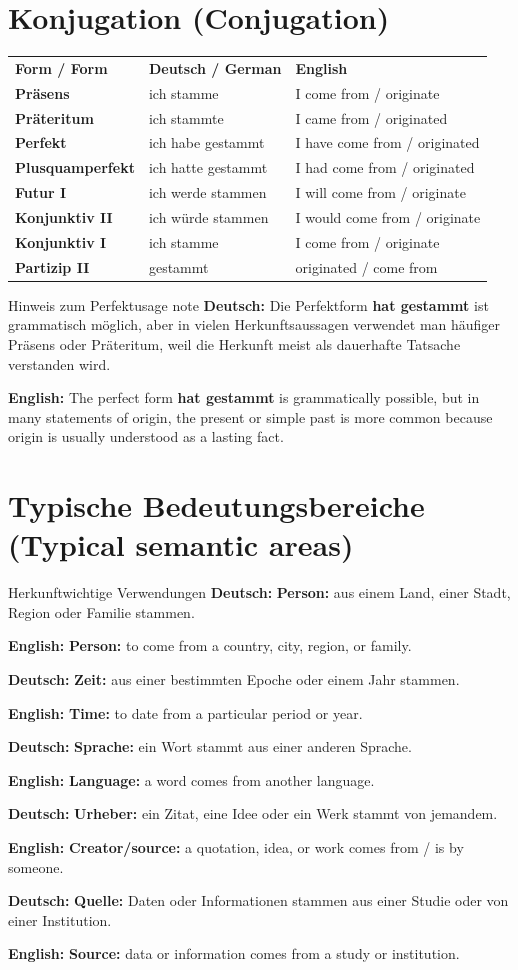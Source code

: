 \documentclass[a4paper,11pt]{article}
\newcommand{\GermanText}[1]{\textbf{Deutsch: }#1\par}
\newcommand{\EnglishText}[1]{{\small\color{SoftGray}\textbf{English: }#1\par}}
\begin{document}
\section{Konjugation \textnormal{(Conjugation)}}
\begin{longtable}{>{\bfseries}p{3.4cm}|p{5.0cm}|p{5.5cm}}
\rowcolor{HeaderBlueDark}
\color{white}\textbf{Form / Form} & \color{white}\textbf{Deutsch / German} & \color{white}\textbf{English} \\
Präsens & ich stamme & I come from / originate \\
Präteritum & ich stammte & I came from / originated \\
Perfekt & ich habe gestammt & I have come from / originated \\
Plusquamperfekt & ich hatte gestammt & I had come from / originated \\
Futur I & ich werde stammen & I will come from / originate \\
Konjunktiv II & ich würde stammen & I would come from / originate \\
Konjunktiv I & ich stamme & I come from / originate \\
Partizip II & gestammt & originated / come from \\
\end{longtable}
\begin{grammarentry}{Hinweis zum Perfekt}{usage note}
\GermanText{Die Perfektform \textbf{hat gestammt} ist grammatisch möglich, aber in vielen Herkunftsaussagen verwendet man häufiger Präsens oder Präteritum, weil die Herkunft meist als dauerhafte Tatsache verstanden wird.}
\EnglishText{The perfect form \textbf{hat gestammt} is grammatically possible, but in many statements of origin, the present or simple past is more common because origin is usually understood as a lasting fact.}
\end{grammarentry}

\section{Typische Bedeutungsbereiche \textnormal{(Typical semantic areas)}}
\begin{grammarentry}{Herkunft}{wichtige Verwendungen}
\GermanText{\textbf{Person:} aus einem Land, einer Stadt, Region oder Familie stammen.}
\EnglishText{\textbf{Person:} to come from a country, city, region, or family.}
\GermanText{\textbf{Zeit:} aus einer bestimmten Epoche oder einem Jahr stammen.}
\EnglishText{\textbf{Time:} to date from a particular period or year.}
\GermanText{\textbf{Sprache:} ein Wort stammt aus einer anderen Sprache.}
\EnglishText{\textbf{Language:} a word comes from another language.}
\GermanText{\textbf{Urheber:} ein Zitat, eine Idee oder ein Werk stammt von jemandem.}
\EnglishText{\textbf{Creator/source:} a quotation, idea, or work comes from / is by someone.}
\GermanText{\textbf{Quelle:} Daten oder Informationen stammen aus einer Studie oder von einer Institution.}
\EnglishText{\textbf{Source:} data or information comes from a study or institution.}
\end{grammarentry}
\end{document}

